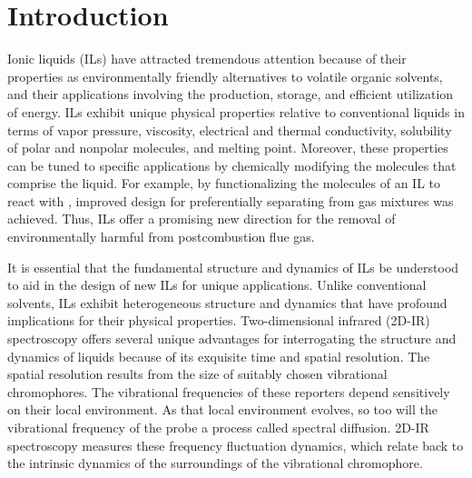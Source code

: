 \section{Introduction}
\label{paper_03:sec:I}

Ionic liquids (ILs) have attracted tremendous attention because of their properties as environmentally friendly alternatives to volatile organic solvents, and their applications involving the production, storage, and efficient utilization of energy.\cite{Karadas2010,wishartEES-09,Armand2009,Patel2012,baraACR-10} ILs exhibit unique physical properties relative to conventional liquids in terms of vapor pressure, viscosity, electrical and thermal conductivity, solubility of polar and nonpolar molecules, and melting point.\cite{baraACR-10,Crosthwaite2005,seki_effects_2010,Tokuda2005,anthonyJPCB-02} Moreover, these properties can be tuned to specific applications by chemically modifying the molecules that comprise the liquid. For example, by functionalizing the molecules of an IL to react with , improved design for preferentially separating  from gas mixtures was achieved.\cite{anthonyJPCB-02,seoJPCB-14,shiflett_solubilities_2005,Gurkan2010,Cadena2004} Thus, ILs offer a promising new direction for the removal of environmentally harmful  from postcombustion flue gas.

It is essential that the fundamental structure and dynamics of ILs be understood to aid in the design of new ILs for unique applications.  Unlike conventional solvents, ILs exhibit heterogeneous structure and dynamics that have profound implications for their physical properties.  Two-dimensional infrared (2D-IR) spectroscopy offers several unique advantages for interrogating the structure and dynamics of liquids because of its exquisite time and spatial resolution.\cite{Tamimi2016b,Ren2014,hamm_concepts_2011,khalil_coherent_2003} The spatial resolution results from the size of suitably chosen vibrational chromophores. The vibrational frequencies of these reporters depend sensitively on their local environment.\cite{Ren2014,levinson_phosphate_2011,choi_vibrational_2011,choiJCP-08,Lee2011,steinelCPL-04} As that local environment evolves, so too will the vibrational frequency of the probe \textemdash{} a process called spectral diffusion. 2D-IR spectroscopy measures these frequency fluctuation dynamics, which relate back to the intrinsic dynamics of the surroundings of the vibrational chromophore.

